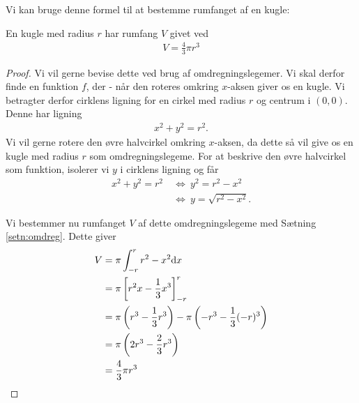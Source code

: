 \documentclass[12pt]{article}
\begin{document}
Vi kan bruge denne formel til at bestemme rumfanget af en kugle:
\begin{setn}
En kugle med radius $r$ har rumfang $V$ givet ved
\begin{align*}
V = \frac{4}{3}\pi r^3
\end{align*}
\end{setn}
\begin{proof}
Vi vil gerne bevise dette ved brug af omdregningslegemer. Vi skal derfor finde en funktion $f$, der - når den roteres omkring $x$-aksen giver os en kugle. Vi betragter derfor cirklens ligning for en cirkel med radius $r$ og centrum i $(0,0)$. Denne har ligning
\begin{align*}
x^2+y^2 = r^2.
\end{align*}
Vi vil gerne rotere den øvre halvcirkel omkring $x$-aksen, da dette så vil give os en kugle med radius $r$ som omdregningslegeme. For at beskrive den øvre halvcirkel som funktion, isolerer vi $y$ i cirklens ligning og får
\begin{align*}
x^2+y^2 = r^2 \ &\Leftrightarrow \ y^2 = r^2-x^2 \\
& \Leftrightarrow \ y = \sqrt{r^2-x^2}.
\end{align*}

Vi bestemmer nu rumfanget $V$ af dette omdregningslegeme med Sætning \ref{setn:omdreg}. Dette giver 
\begin{align*}
V &= \pi\int_{-r}^r r^2-x^2 \textnormal{d} x\\
&= \pi\left[r^2x-\frac{1}{3}x^3\right]_{-r}^r\\
&= \pi\left(r^3-\frac{1}{3}r^3\right)-\pi\left(-r^3-\frac{1}{3}(-r)^3\right) \\
&= \pi\left(2r^3-\frac{2}{3}r^3\right)\\
&= \frac{4}{3}\pi r^3
\end{align*}

\end{proof}
\end{document}
